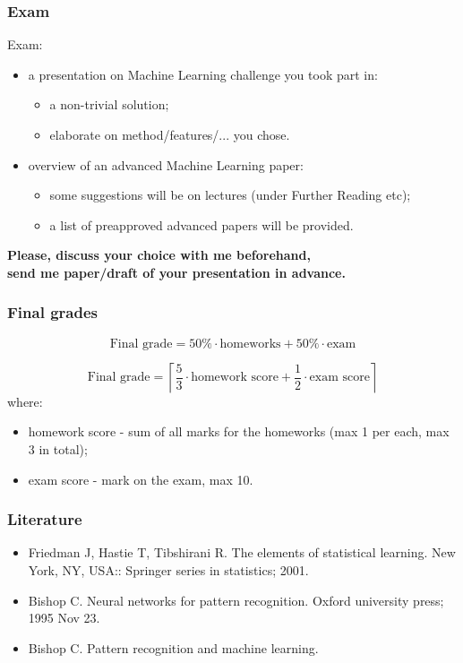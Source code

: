 \documentclass[mathserif, aspectratio=43]{beamer}
\begin{document}
\begin{frame}[fragile]
\frametitle{Exam}
\vspace*{5mm}
Exam:
\begin{itemize}
\item a presentation on Machine Learning challenge you took part in:\begin{itemize}
\item a non-trivial solution;
\item elaborate on method/features/... you chose.
\end{itemize}

\item overview of an advanced Machine Learning paper:\begin{itemize}
\item some suggestions will be on lectures (under Further Reading etc);
\item a list of preapproved advanced papers will be provided.
\end{itemize}

\end{itemize}
\begin{center}
\textbf{ \large Please, discuss your choice with me beforehand,\\ send me paper/draft of your presentation in advance.}
\end{center}

\end{frame}


\begin{frame}[fragile]
\frametitle{Final grades}
$$\text{Final grade} = 50\% \cdot \text{homeworks} + 50\% \cdot \text{exam}$$

$$\text{Final grade} = \left\lceil \frac{5}{3} \cdot \text{homework score} + \frac{1}{2} \cdot \text{exam score} \right\rceil$$where:
\begin{itemize}
\item homework score - sum of all marks for the homeworks (max 1 per each, max 3 in total);
\item exam score - mark on the exam, max 10.
\end{itemize}

\end{frame}


\begin{frame}[fragile]
\frametitle{Literature}
\begin{itemize}
\item Friedman J, Hastie T, Tibshirani R. The elements of statistical learning. New York, NY, USA:: Springer series in statistics; 2001.
\item Bishop C. Neural networks for pattern recognition. Oxford university press; 1995 Nov 23.
\item Bishop C. Pattern recognition and machine learning.
\end{itemize}

\end{frame}
\end{document}
